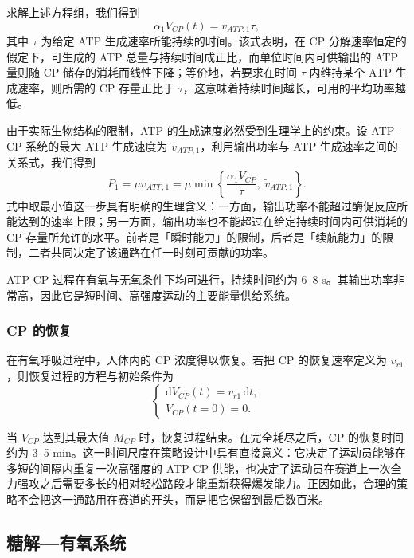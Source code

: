 \documentclass[11pt,a4paper]{ctexart}
\begin{document}
求解上述方程组，我们得到
\begin{equation}
\alpha_1 V_{CP}(t)=v_{ATP,1}\tau,
\end{equation}
其中 $\tau$ 为给定 ATP 生成速率所能持续的时间。该式表明，在 CP 分解速率恒定的假定下，可生成的 ATP 总量与持续时间成正比，而单位时间内可供输出的 ATP 量则随 CP 储存的消耗而线性下降；等价地，若要求在时间 $\tau$ 内维持某个 ATP 生成速率，则所需的 CP 存量正比于 $\tau$，这意味着持续时间越长，可用的平均功率越低。

由于实际生物结构的限制，ATP 的生成速度必然受到生理学上的约束。设 ATP-CP 系统的最大 ATP 生成速度为 $\tilde{v}_{ATP,1}$，利用输出功率与 ATP 生成速率之间的关系式，我们得到
\begin{equation}
P_1=\mu v_{ATP,1}=\mu\min\left\{\frac{\alpha_1 V_{CP}}{\tau},\ \tilde{v}_{ATP,1}\right\}.
\end{equation}
式中取最小值这一步具有明确的生理含义：一方面，输出功率不能超过酶促反应所能达到的速率上限；另一方面，输出功率也不能超过在给定持续时间内可供消耗的 CP 存量所允许的水平。前者是「瞬时能力」的限制，后者是「续航能力」的限制，二者共同决定了该通路在任一时刻可贡献的功率。

ATP-CP 过程在有氧与无氧条件下均可进行，持续时间约为 6--8 s。其输出功率非常高，因此它是短时间、高强度运动的主要能量供给系统。

\subsubsection{CP 的恢复}

在有氧呼吸过程中，人体内的 CP 浓度得以恢复。若把 CP 的恢复速率定义为 $v_{r1}$，则恢复过程的方程与初始条件为
\begin{equation}
\begin{cases}
\mathrm{d}V_{CP}(t)=v_{r1}\,\mathrm{d}t,\\[0.3em]
V_{CP}(t=0)=0.
\end{cases}
\end{equation}

当 $V_{CP}$ 达到其最大值 $M_{CP}$ 时，恢复过程结束。在完全耗尽之后，CP 的恢复时间约为 3--5 min。这一时间尺度在策略设计中具有直接意义：它决定了运动员能够在多短的间隔内重复一次高强度的 ATP-CP 供能，也决定了运动员在赛道上一次全力强攻之后需要多长的相对轻松路段才能重新获得爆发能力。正因如此，合理的策略不会把这一通路用在赛道的开头，而是把它保留到最后数百米。

\subsection{糖解—有氧系统}
\end{document}
